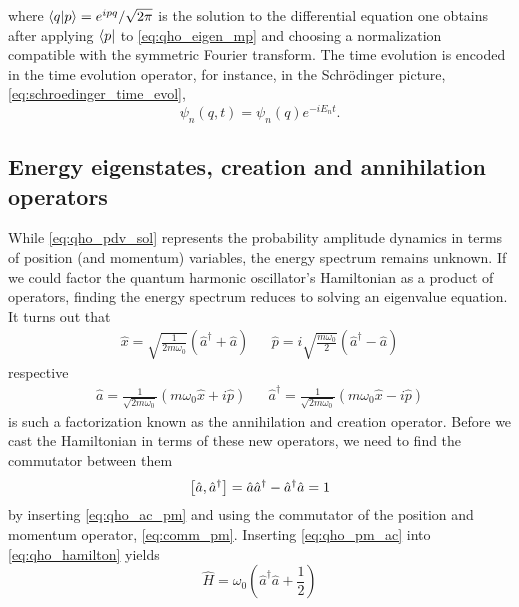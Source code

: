 where $\braket{q}{p}=e^{ipq}/\sqrt{2\pi}$ is the solution to the differential equation one obtains after applying $\bra{p}$ to \cref{eq:qho_eigen_mp} and choosing a normalization compatible with the symmetric Fourier transform.
The time evolution is encoded in the time evolution operator, for instance, in the Schrödinger picture, \cref{eq:schroedinger_time_evol},
\begin{equation}
    \psi_n(q,t)
    =
    \psi_n(q)
    e^{-iE_nt}
    .
\end{equation}

\subsection{Energy eigenstates, creation and annihilation operators}

While \cref{eq:qho_pdv_sol} represents the probability amplitude dynamics in terms of position (and momentum) variables, the energy spectrum remains unknown.
If we could factor the quantum harmonic oscillator's Hamiltonian as a product of operators, finding the energy spectrum reduces to solving an eigenvalue equation.
It turns out that
\begin{align}
    \hat{x}
    =
    \sqrt{\frac{1}{2m\omega_0}}
    \left(\hat{a}^\dagger+\hat{a}\right)
    &&
    \hat{p}
    =
    i\sqrt{\frac{m\omega_0}{2}}
    \left(\hat{a}^\dagger-\hat{a}\right)
    \label{eq:qho_pm_ac}
\end{align}
respective
\begin{align}
    \hat{a}
    =
    \frac{1}{\sqrt{2m\omega_0}}
    \left(m\omega_0\hat{x}+i\hat{p}\right)
    &&
    \hat{a}^\dagger
    =
    \frac{1}{\sqrt{2m\omega_0}}
    \left(m\omega_0\hat{x}-i\hat{p}\right)
    \label{eq:qho_ac_pm}
\end{align}
is such a factorization known as the annihilation and creation operator.
Before we cast the Hamiltonian in terms of these new operators, we need to find the commutator between them
\begin{equation}
    \comm{\hat{a}}{\hat{a}^\dagger}
    =
    \hat{a}\hat{a}^\dagger
    -
    \hat{a}^\dagger\hat{a}
    =
    1
    \label{eq:qho_comm_ac}
\end{equation}
by inserting \cref{eq:qho_ac_pm} and using the commutator of the position and momentum operator, \cref{eq:comm_pm}.
Inserting \cref{eq:qho_pm_ac} into \cref{eq:qho_hamilton} yields
\begin{equation}
    \hat{H}
    =
    \omega_0\left(\hat{a}^\dagger\hat{a}+\frac{1}{2}\right)
    \label{eq:qho_hamilton_ac}
\end{equation}
